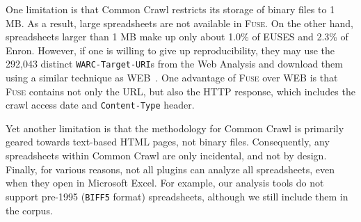 \documentclass[conference]{IEEEtran}
\newcommand{\urlcountunique}{292,043}
\begin{document}
One limitation is that Common Crawl restricts its storage of binary files to 1 MB. As a result, large spreadsheets are not available in \textsc{Fuse}. On the other hand, spreadsheets larger than 1 MB make up only about 1.0\% of EUSES and 2.3\% of Enron.
%
However, if one is willing to give up reproducibility, they may use the \urlcountunique{} distinct \texttt{WARC-Target-URI}s from the Web Analysis and download them using a similar technique as WEB~\cite{Chen2013}. 
%
One advantage of \textsc{Fuse} over WEB is that \textsc{Fuse} contains not only the URL, but also the HTTP response, which includes the crawl access date and \texttt{Content-Type} header.

Yet another limitation is that the methodology for Common Crawl is primarily geared towards text-based HTML pages, not binary files. Consequently, any spreadsheets within Common Crawl are only incidental, and not by design. 
%
Finally, for various reasons, not all plugins can analyze all spreadsheets, even when they open in Microsoft Excel. 
%
For example, our analysis tools do not support pre-1995 (\texttt{BIFF5} format) spreadsheets, although we still include them in the corpus.




\end{document}
